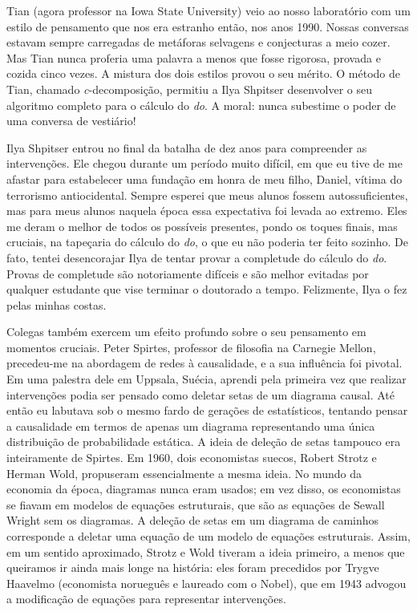\documentclass[11pt,a5paper,twoside]{book}
\begin{document}
Tian (agora professor na Iowa State University) veio ao nosso laboratório com um estilo de pensamento que nos era estranho então, nos anos 1990. Nossas conversas estavam sempre carregadas de metáforas selvagens e conjecturas a meio cozer. Mas Tian nunca proferia uma palavra a menos que fosse rigorosa, provada e cozida cinco vezes. A mistura dos dois estilos provou o seu mérito. O método de Tian, chamado \textit{c}-decomposição, permitiu a Ilya Shpitser desenvolver o seu algoritmo completo para o cálculo do \textit{do}. A moral: nunca subestime o poder de uma conversa de vestiário!

Ilya Shpitser entrou no final da batalha de dez anos para compreender as intervenções. Ele chegou durante um período muito difícil, em que eu tive de me afastar para estabelecer uma fundação em honra de meu filho, Daniel, vítima do terrorismo antiocidental. Sempre esperei que meus alunos fossem autossuficientes, mas para meus alunos naquela época essa expectativa foi levada ao extremo. Eles me deram o melhor de todos os possíveis presentes, pondo os toques finais, mas cruciais, na tapeçaria do cálculo do \textit{do}, o que eu não poderia ter feito sozinho. De fato, tentei desencorajar Ilya de tentar provar a completude do cálculo do \textit{do}. Provas de completude são notoriamente difíceis e são melhor evitadas por qualquer estudante que vise terminar o doutorado a tempo. Felizmente, Ilya o fez pelas minhas costas.

Colegas também exercem um efeito profundo sobre o seu pensamento em momentos cruciais. Peter Spirtes, professor de filosofia na Carnegie Mellon, precedeu-me na abordagem de redes à causalidade, e a sua influência foi pivotal. Em uma palestra dele em Uppsala, Suécia, aprendi pela primeira vez que realizar intervenções podia ser pensado como deletar setas de um diagrama causal. Até então eu labutava sob o mesmo fardo de gerações de estatísticos, tentando pensar a causalidade em termos de apenas um diagrama representando uma única distribuição de probabilidade estática. A ideia de deleção de setas tampouco era inteiramente de Spirtes. Em 1960, dois economistas suecos, Robert Strotz e Herman Wold, propuseram essencialmente a mesma ideia. No mundo da economia da época, diagramas nunca eram usados; em vez disso, os economistas se fiavam em modelos de equações estruturais, que são as equações de Sewall Wright sem os diagramas. A deleção de setas em um diagrama de caminhos corresponde a deletar uma equação de um modelo de equações estruturais. Assim, em um sentido aproximado, Strotz e Wold tiveram a ideia primeiro, a menos que queiramos ir ainda mais longe na história: eles foram precedidos por Trygve Haavelmo (economista norueguês e laureado com o Nobel), que em 1943 advogou a modificação de equações para representar intervenções.
\end{document}
